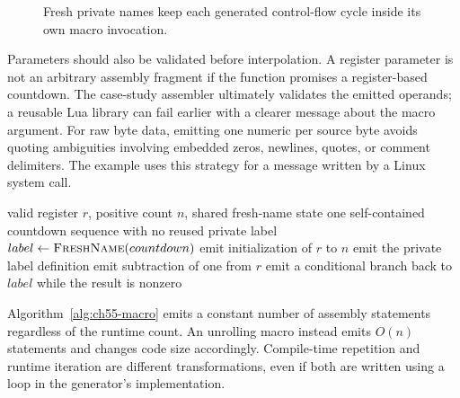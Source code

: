 \begin{figure}[htbp]
\centering
{}
\caption{Fresh private names keep each generated control-flow cycle inside its own macro invocation.}
\label{fig:ch55-fresh}
\end{figure}

Parameters should also be validated before interpolation.
A register parameter is not an arbitrary assembly fragment if the function promises a register-based countdown.
The case-study assembler ultimately validates the emitted operands; a reusable Lua library can fail earlier with a clearer message about the macro argument.
For raw byte data, emitting one numeric  per source byte avoids quoting ambiguities involving embedded zeros, newlines, quotes, or comment delimiters.
The  example uses this strategy for a message written by a Linux system call.

\begin{algorithm}[htbp]
\caption{Expand a counted assembly macro with a private label.}
\label{alg:ch55-macro}
\begin{pseudocode}
\Require valid register $r$, positive count $n$, shared fresh-name state
\Ensure one self-contained countdown sequence with no reused private label
\State $label\gets\Call{FreshName}{countdown}$
\State emit initialization of $r$ to $n$
\State emit the private label definition
\State emit subtraction of one from $r$
\State emit a conditional branch back to $label$ while the result is nonzero
\end{pseudocode}
\end{algorithm}

Algorithm~\ref{alg:ch55-macro} emits a constant number of assembly statements regardless of the runtime count.
An unrolling macro instead emits $O(n)$ statements and changes code size accordingly.
Compile-time repetition and runtime iteration are different transformations, even if both are written using a loop in the generator's implementation.

